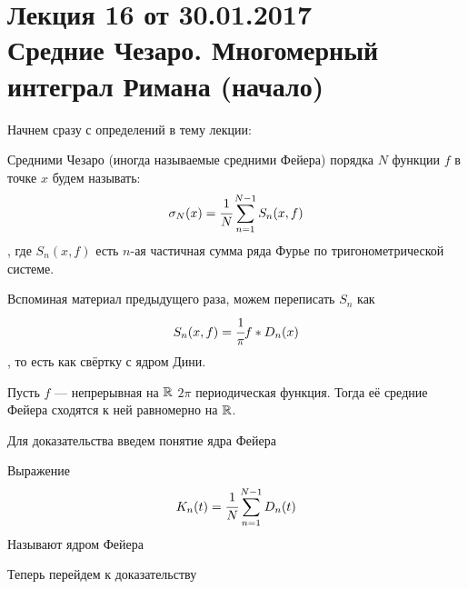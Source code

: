 \documentclass[a4paper, 12pt]{article}
\begin{document}
\pagestyle{fancy}
\section{Лекция 16 от 30.01.2017 \\ Средние Чезаро. Многомерный интеграл Римана (начало)}
	Начнем сразу с определений в тему лекции:
	\begin{Def}
		Средними Чезаро (иногда называемые средними Фейера) порядка $N$ функции $f$ в точке $x$ будем называть:
		$$
			\sigma_N(x) = \cfrac{1}{N} \sum\limits_{n =1}^{N -1}S_n(x,f)
		$$
		, где $S_n(x,f)$ есть $n$-ая частичная сумма ряда Фурье по тригонометрической системе.
	\end{Def}
	Вспоминая материал предыдущего раза, можем переписать $S_n$ как
	$$
		S_n(x,f) = \cfrac{1}{\pi} f*D_n(x)
	$$
	, то есть как свёртку с ядром Дини.
	\begin{Theorem}
		Пусть $f$ --- непрерывная на $\mathbb{R}$ $2\pi$ периодическая функция. Тогда её средние Фейера сходятся к ней равномерно на $\mathbb{R}$. 
	\end{Theorem}
	Для доказательства введем понятие ядра Фейера
	\begin{Def}
		Выражение
		$$
			K_n(t) = \cfrac{1}{N}\sum\limits_{n=1}^{N-1}D_n(t)
		$$
		Называют ядром Фейера
	\end{Def}
	Теперь перейдем к доказательству
\end{document}
